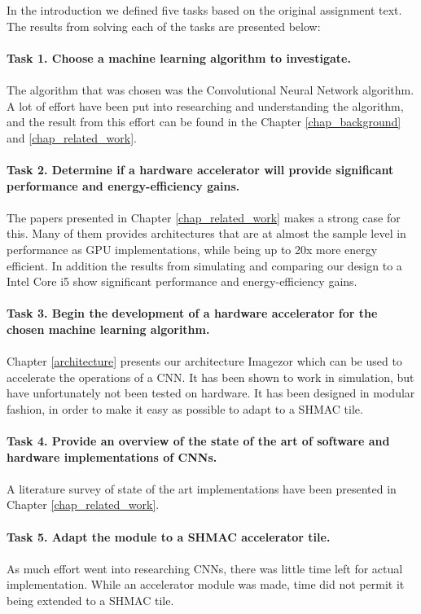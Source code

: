 In the introduction we defined five tasks based on the original assignment text. The results from solving each of the tasks are presented below: \\ \hfil \\ \hfil
\textbf{Task 1. Choose a machine learning algorithm to investigate.} \\ \hfil \\ \hfil
The algorithm that was chosen was the Convolutional Neural Network algorithm. A lot of effort have been put into researching and understanding the algorithm, and the result from this effort can be found in the Chapter \ref{chap_background} and \ref{chap_related_work}. \\ \hfil \\ \hfil
\textbf{Task 2. Determine if a hardware accelerator will provide significant performance and energy-efficiency gains.}  \\ \hfil \\ \hfil
The papers presented in Chapter \ref{chap_related_work} makes a strong case for this. Many of them provides architectures that are at almost the sample level in performance as GPU implementations, while being up to 20x more energy efficient. In addition the results from simulating and comparing our design to a Intel Core i5 show significant performance and energy-efficiency gains. \\ \hfil \\ \hfil
\textbf{Task 3. Begin the development of a hardware accelerator for the chosen machine learning algorithm.}\\ \hfil \\ \hfil
Chapter \ref{architecture} presents our architecture Imagezor which can be used to accelerate the operations of a CNN. It has been shown to work in simulation, but have unfortunately not been tested on hardware. It has been designed in modular fashion, in order to make it easy as possible to adapt to a SHMAC tile. \\ \hfil \\ \hfil
\textbf{Task 4. Provide an overview of the state of the art of software and hardware implementations of CNNs.} \\ \hfil \\ \hfil
A literature survey of state of the art implementations have been presented in Chapter \ref{chap_related_work}.\\ \hfil \\ \hfil
\textbf{Task 5. Adapt the module to a SHMAC accelerator tile.} \\ \hfil \\ \hfil
As much effort went into researching CNNs, there was little time left for actual implementation. While an accelerator module was made, time did not permit it being extended to a SHMAC tile. \\ \hfil \\ \hfil




 